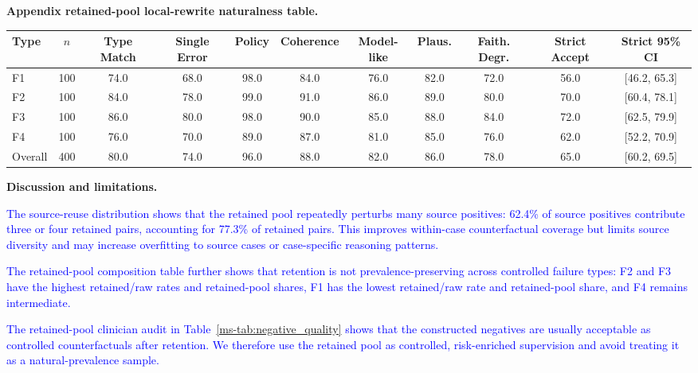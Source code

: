 \documentclass[12pt]{article}
\newcommand{\added}[1]{\textcolor{blue}{#1}}
\begin{document}
\textbf{Appendix retained-pool local-rewrite naturalness table.}
\begin{displayquote}
\captionof{table}{\added{Clinician validation of the risk-retained controlled negative pool. All rates are computed on 400 retained negatives, stratified as 100 items per F1--F4 type.}}
\begin{adjustbox}{max width=\linewidth}
\begin{tabular}{lcccccccccc}
\toprule
\textbf{Type} & \textbf{$n$} & \textbf{Type Match} & \textbf{Single Error} & \textbf{Policy} & \textbf{Coherence} & \textbf{Model-like} & \textbf{Plaus.} & \textbf{Faith. Degr.} & \textbf{Strict Accept} & \textbf{Strict 95\% CI} \\
\midrule
F1 & 100 & 74.0 & 68.0 & 98.0 & 84.0 & 76.0 & 82.0 & 72.0 & 56.0 & [46.2, 65.3] \\
F2 & 100 & 84.0 & 78.0 & 99.0 & 91.0 & 86.0 & 89.0 & 80.0 & 70.0 & [60.4, 78.1] \\
F3 & 100 & 86.0 & 80.0 & 98.0 & 90.0 & 85.0 & 88.0 & 84.0 & 72.0 & [62.5, 79.9] \\
F4 & 100 & 76.0 & 70.0 & 89.0 & 87.0 & 81.0 & 85.0 & 76.0 & 62.0 & [52.2, 70.9] \\
\midrule
Overall & 400 & 80.0 & 74.0 & 96.0 & 88.0 & 82.0 & 86.0 & 78.0 & 65.0 & [60.2, 69.5] \\
\bottomrule
\end{tabular}
\end{adjustbox}
\end{displayquote}

\textbf{Discussion and limitations.}
\begin{displayquote}
\added{The source-reuse distribution shows that the retained pool repeatedly perturbs many source positives: 62.4\% of source positives contribute three or four retained pairs, accounting for 77.3\% of retained pairs. This improves within-case counterfactual coverage but limits source diversity and may increase overfitting to source cases or case-specific reasoning patterns.}

\added{The retained-pool composition table further shows that retention is not prevalence-preserving across controlled failure types: F2 and F3 have the highest retained/raw rates and retained-pool shares, F1 has the lowest retained/raw rate and retained-pool share, and F4 remains intermediate.}

\added{The retained-pool clinician audit in Table~\ref*{ms-tab:negative_quality} shows that the constructed negatives are usually acceptable as controlled counterfactuals after retention. We therefore use the retained pool as controlled, risk-enriched supervision and avoid treating it as a natural-prevalence sample.}
\end{displayquote}



\end{document}
